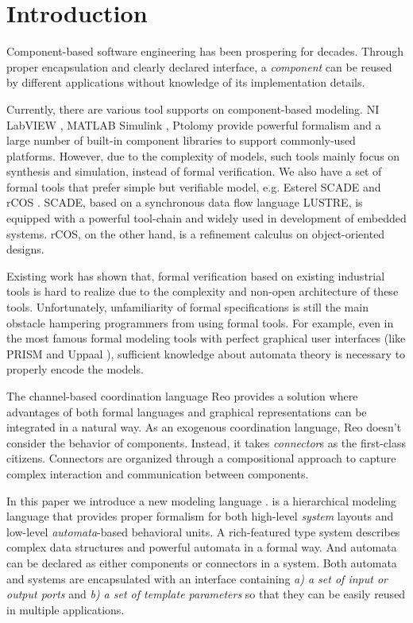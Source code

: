 \section{Introduction}
\label{sec:introduction}

Component-based software engineering has been prospering for decades. Through proper encapsulation and clearly declared interface, a \emph{component} can be reused by different applications without knowledge of its implementation details.

Currently, there are various tool supports on component-based modeling. NI LabVIEW \cite{labview}, MATLAB Simulink \cite{hahn2016essentialsimulink}, Ptolomy \cite{KimPtolomy2017} provide powerful formalism and a large number of built-in component libraries to support commonly-used platforms. However, due to the complexity of models, such tools mainly focus on synthesis and simulation, instead of formal verification.
We also have a set of formal tools that prefer simple but verifiable model, e.g. Esterel SCADE \cite{AbdullaISoLA2006} and rCOS \cite{LiuFsenRcos2010}. SCADE, based on a synchronous data flow language LUSTRE, is equipped with a powerful tool-chain and widely used in development of embedded systems. rCOS, on the other hand, is a refinement calculus on object-oriented designs.

Existing work \cite{ZouSimulinkHcsp2013} has shown that, formal verification based on existing industrial tools is hard to realize due to the complexity and non-open architecture of these tools. Unfortunately, unfamiliarity of formal specifications is still the main obstacle hampering programmers from using formal tools. For example, even in the most famous formal modeling tools with perfect graphical user interfaces (like PRISM \cite{KwiatkowskaCavPrism2011} and Uppaal \cite{AmnellMovepUppaal2001}), sufficient knowledge about automata theory is necessary to properly encode the models.

The channel-based coordination language Reo \cite{ArbabMscsReo2004} provides a solution where advantages of both formal languages and graphical representations can be integrated in a natural way. As an exogenous coordination language, Reo doesn't consider the behavior of components. Instead, it takes \emph{connector}s as the first-class citizens. Connectors are organized through a compositional approach to capture complex interaction and communication between components.

In this paper we introduce a new modeling language \emlang{}. \lang{} is a hierarchical modeling language that provides proper formalism for both high-level \emph{system} layouts and low-level \emph{automata}-based behavioral units. A rich-featured type system describes complex data structures and powerful automata in a formal way. And automata can be declared as either components or connectors in a system. Both automata and systems are encapsulated with an interface containing \emph{a) a set of input or output ports} and \emph{b) a set of template parameters} so that they can be easily reused in multiple applications. 

